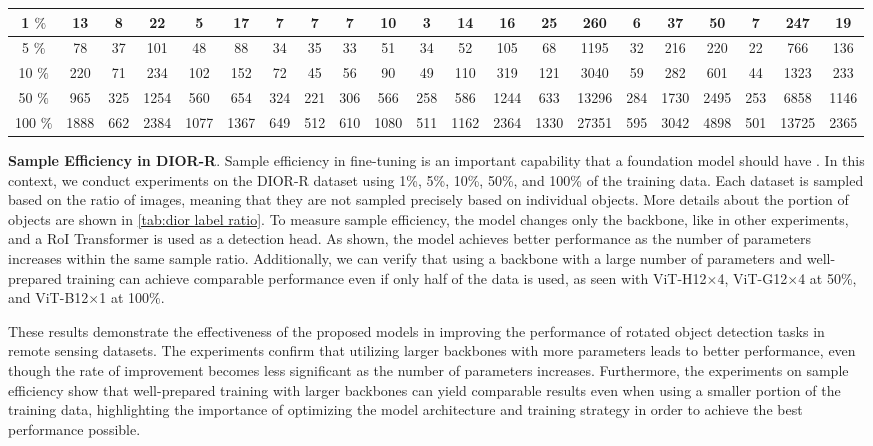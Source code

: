 \begin{table*}[t]{\textwidth=0mm}
{\begin{tabular}{c|c c c c c c c c c c c c c c c c c c c c}
        1 $\%$ & 13 & 8 & 22 & 5 & 17 & 7 & 7 & 7 & 10 & 3 & 14 & 16 & 25 & 260 & 6 & 37 & 50 & 7 & 247 & 19 \\ \hline

        5 $\%$ & 78 & 37 & 101 & 48 & 88 & 34 & 35 & 33 & 51 & 34 & 52 & 105 & 68 & 1195 & 32 & 216 & 220 & 22 & 766 & 136 \\ \hline
        10 $\%$ & 220 & 71 & 234 & 102 & 152 & 72 & 45 & 56 & 90 & 49 & 110 & 319 & 121 & 3040 & 59 & 282 & 601 & 44 & 1323 & 233 \\ \hline
        50 $\%$ & 965 & 325 & 1254 & 560 & 654 & 324 & 221 & 306 & 566 & 258 & 586 & 1244 & 633 & 13296 & 284 & 1730 & 2495 & 253 & 6858 & 1146 \\ \hline
        100 $\%$ & 1888 & 662 & 2384 & 1077 & 1367 & 649 & 512 & 610 & 1080 & 511 & 1162 & 2364 & 1330 & 27351 & 595 & 3042 & 4898 & 501 & 13725 & 2365 \\ \hline
        
    \end{tabular}
    }
    \label{tab:dior label ratio}
\end{table*} 
\textbf{Sample Efficiency in DIOR-R}. Sample efficiency in fine-tuning is an important capability that a foundation model should have \cite{zhang2023vitaev2, bommasani2021opportunities, brown2020language, kim2022fine}. In this context, we conduct experiments on the DIOR-R dataset using 1\%, 5\%, 10\%, 50\%, and 100\% of the training data. Each dataset is sampled based on the ratio of images, meaning that they are not sampled precisely based on individual objects. More details about the portion of objects are shown in \autoref{tab:dior label ratio}. To measure sample efficiency, the model changes only the backbone, like in other experiments, and a RoI Transformer is used as a detection head. As shown, the model achieves better performance as the number of parameters increases within the same sample ratio. Additionally, we can verify that using a backbone with a large number of parameters and well-prepared training can achieve comparable performance even if only half of the data is used, as seen with ViT-H12$\times$4, ViT-G12$\times$4 at 50\%, and ViT-B12$\times$1 at 100\%.

These results demonstrate the effectiveness of the proposed models in improving the performance of rotated object detection tasks in remote sensing datasets. The experiments confirm that utilizing larger backbones with more parameters leads to better performance, even though the rate of improvement becomes less significant as the number of parameters increases. Furthermore, the experiments on sample efficiency show that well-prepared training with larger backbones can yield comparable results even when using a smaller portion of the training data, highlighting the importance of optimizing the model architecture and training strategy in order to achieve the best performance possible.

